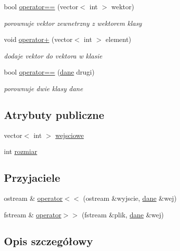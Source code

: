 \begin{DoxyCompactItemize}
bool \hyperlink{classdane_a110ef86ae677f7c30860dcc4f935e35f}{operator==} (vector$<$ int $>$ wektor)
\begin{DoxyCompactList}\small\item\em porownuje vektor zewnetrzny z wektorem klasy \end{DoxyCompactList}\item 
void \hyperlink{classdane_a058ddbd9e4776c8d46310c67ba22c6db}{operator+} (vector$<$ int $>$ element)
\begin{DoxyCompactList}\small\item\em dodaje vektor do vektora w klasie \end{DoxyCompactList}\item 
bool \hyperlink{classdane_ab2387c22ea50d971126631d094f48376}{operator==} (\hyperlink{classdane}{dane} drugi)
\begin{DoxyCompactList}\small\item\em porownuje dwie klasy dane \end{DoxyCompactList}\end{DoxyCompactItemize}
\subsection*{\-Atrybuty publiczne}
\begin{DoxyCompactItemize}
\item 
vector$<$ int $>$ \hyperlink{classdane_a54607ce56b0cf755637110b0b81f5dde}{wejsciowe}
\item 
int \hyperlink{classdane_ac22495cbe79aa41bf0d6c44a27755306}{rozmiar}
\end{DoxyCompactItemize}
\subsection*{\-Przyjaciele}
\begin{DoxyCompactItemize}
\item 
ostream \& \hyperlink{classdane_a7ed2c8398056f86ea981b02c3abe3a1f}{operator$<$$<$} (ostream \&wyjscie, \hyperlink{classdane}{dane} \&wej)
\item 
fstream \& \hyperlink{classdane_a4f5402546464f59b7fdf3a9a5e5be220}{operator$>$$>$} (fstream \&plik, \hyperlink{classdane}{dane} \&wej)
\end{DoxyCompactItemize}


\subsection{\-Opis szczegółowy}


